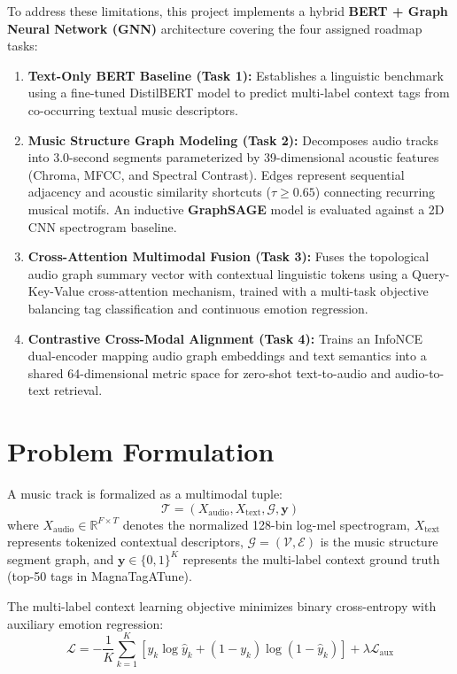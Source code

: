 \documentclass{article}
\begin{document}
To address these limitations, this project implements a hybrid \textbf{BERT + Graph Neural Network (GNN)} architecture covering the four assigned roadmap tasks:
\begin{enumerate}
    \item \textbf{Text-Only BERT Baseline (Task 1):} Establishes a linguistic benchmark using a fine-tuned DistilBERT model to predict multi-label context tags from co-occurring textual music descriptors.
    \item \textbf{Music Structure Graph Modeling (Task 2):} Decomposes audio tracks into 3.0-second segments parameterized by 39-dimensional acoustic features (Chroma, MFCC, and Spectral Contrast). Edges represent sequential adjacency and acoustic similarity shortcuts ($\tau \ge 0.65$) connecting recurring musical motifs. An inductive \textbf{GraphSAGE} model is evaluated against a 2D CNN spectrogram baseline.
    \item \textbf{Cross-Attention Multimodal Fusion (Task 3):} Fuses the topological audio graph summary vector with contextual linguistic tokens using a Query-Key-Value cross-attention mechanism, trained with a multi-task objective balancing tag classification and continuous emotion regression.
    \item \textbf{Contrastive Cross-Modal Alignment (Task 4):} Trains an InfoNCE dual-encoder mapping audio graph embeddings and text semantics into a shared 64-dimensional metric space for zero-shot text-to-audio and audio-to-text retrieval.
\end{enumerate}

\section{Problem Formulation}
A music track is formalized as a multimodal tuple:
\begin{equation}
    \mathcal{T} = \left( X_{\text{audio}}, X_{\text{text}}, \mathcal{G}, \mathbf{y} \right)
\end{equation}
where $X_{\text{audio}} \in \mathbb{R}^{F \times T}$ denotes the normalized 128-bin log-mel spectrogram, $X_{\text{text}}$ represents tokenized contextual descriptors, $\mathcal{G} = (\mathcal{V}, \mathcal{E})$ is the music structure segment graph, and $\mathbf{y} \in \{0, 1\}^K$ represents the multi-label context ground truth (top-50 tags in MagnaTagATune).

The multi-label context learning objective minimizes binary cross-entropy with auxiliary emotion regression:
\begin{equation}
    \mathcal{L} = -\frac{1}{K}\sum_{k=1}^K \left[ y_k \log \hat{y}_k + (1 - y_k) \log(1 - \hat{y}_k) \right] + \lambda \mathcal{L}_{\text{aux}}
\end{equation}
\end{document}
